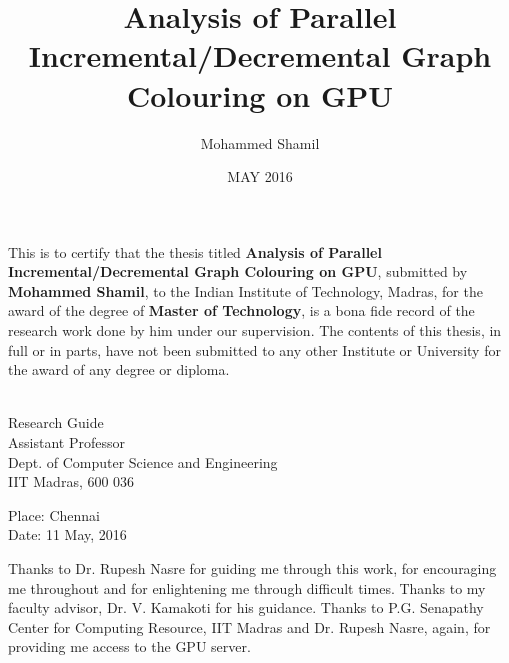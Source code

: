 \documentclass[MTech]{iitmdiss}
\def\thesistitle{Analysis of Parallel Incremental/Decremental Graph Colouring on GPU}
\def\thesisauthor{Mohammed Shamil}
\begin{document}

\title{\thesistitle}

\author{\thesisauthor}

\date{MAY 2016}

\maketitle

\certificate

\vspace*{0.5in}

\noindent This is to certify that the thesis titled {\bf {\thesistitle}}, submitted by {\bf {\thesisauthor}}, 
  to the Indian Institute of Technology, Madras, for
the award of the degree of {\bf Master of Technology}, is a bona fide
record of the research work done by him under our supervision.  The
contents of this thesis, in full or in parts, have not been submitted
to any other Institute or University for the award of any degree or
diploma.

\vspace*{1.5in}
\hspace*{-0.25in}
\begin{singlespace}
 \\
\noindent Research Guide \\ 
\noindent Assistant Professor \\
\noindent Dept. of Computer Science and Engineering\\
\noindent IIT Madras, 600 036 \\
\end{singlespace}
\vspace*{0.25in}
\noindent Place: Chennai\\ 
Date: 11 May, 2016


\acknowledgements

Thanks to Dr. Rupesh Nasre for guiding me through this work, for encouraging me throughout and for enlightening me through difficult times. Thanks to my faculty advisor, Dr. V. Kamakoti for his guidance. Thanks to P.G. Senapathy Center for Computing Resource, IIT Madras and Dr. Rupesh Nasre, again, for providing me access to the GPU server. 
\end{document}
